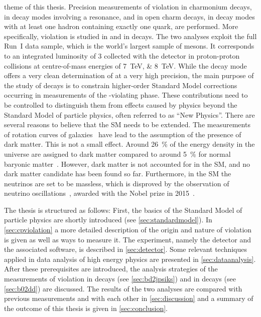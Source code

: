 theme of this thesis. Precision measurements of \CP violation in charmonium
decays, \ie in decay modes involving a \ccbar resonance, and in open charm
decays, \ie in decay modes with at least one hadron containing exactly one
\cquark quark, are performed. More specifically, \CP violation is studied in
\BdToJPsiKS and in \BdToDD decays. The two analyses exploit the full Run~I
data sample, which is the world's largest sample of \Bz mesons. It corresponds
to an integrated luminosity of \SI{3}{\invfb} collected with the \lhcb
detector in proton-proton collisions at centre-of-mass energies of
\SIlist{7;8}{\TeV}. While the decay mode \BdToJPsiKS offers a very clean
determination of \sintwobeta at a very high precision, the main purpose of the
study of \BdToDD decays is to constrain higher-order Standard Model
corrections occurring in measurements of the \CP-violating phase. These
contributions need to be controlled to distinguish them from effects caused by
physics beyond the Standard Model of particle physics, often referred to as
\enquote{New Physics}. There are several reasons to believe that the SM needs
to be extended. The measurements of rotation curves of
galaxies~\cite{AndromedaNebula} have lead to the assumption of the presence of
dark matter. This is not a small effect. Around \SI{26}{\percent} of the
energy density in the universe are assigned to dark matter compared to around
\SI{5}{\percent} for normal baryonic matter~\cite{Ade:2015xua}. However, dark
matter is not accounted for in the SM, and no dark matter candidate has been
found so far. Furthermore, in the SM the neutrinos are set to be massless,
which is disproved by the observation of neutrino
oscillations~\cite{Fukuda:1998mi,Ahmad:2001an,*Ahmad:2002jz}, awarded with the
Nobel prize in 2015~\cite{NobelPrize2015}.

The thesis is structured as follows: First, the basics of the
Standard Model of particle physics are shortly introduced (see
\cref{sec:standardmodel}). In \cref{sec:cpviolation} a more detailed
description of the origin and nature of \CP violation is given as well as ways
to measure it. The \lhcb experiment, namely the detector and the associated
software, is described in \cref{sec:detector}. Some relevant techniques
applied in data analysis of high energy physics are presented in
\cref{sec:dataanalysis}. After these prerequisites are introduced, the analysis
strategies of the measurements of \CP violation in \BdToJPsiKS decays (see
\cref{sec:bd2jpsiks}) and in \BdToDD decays (see \cref{sec:b02dd}) are
discussed. The results of the two analyses are compared with previous
measurements and with each other in \cref{sec:discussion} and a summary of the
outcome of this thesis is given in \cref{sec:conclusion}.

